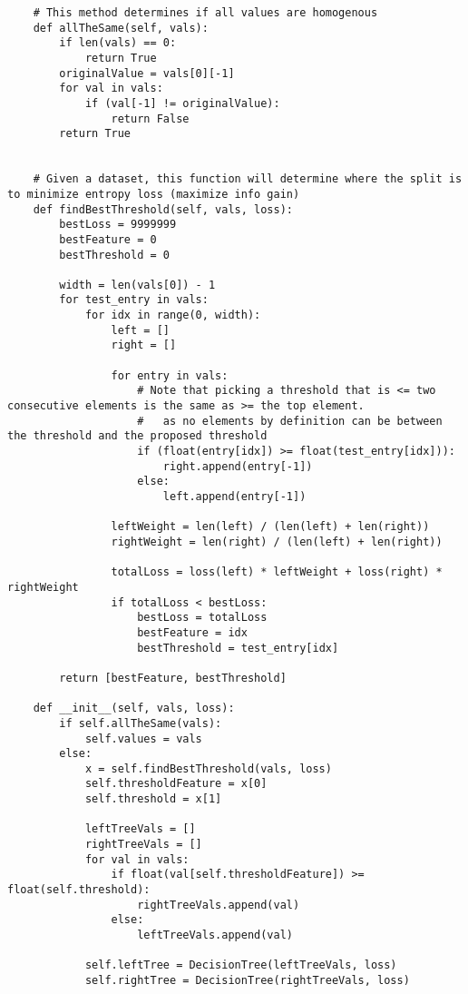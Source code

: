\documentclass{article}
\begin{document}
\begin{titlepage}
\begin{lstlisting}
    # This method determines if all values are homogenous
    def allTheSame(self, vals):
        if len(vals) == 0:
            return True
        originalValue = vals[0][-1]
        for val in vals:
            if (val[-1] != originalValue):
                return False
        return True


    # Given a dataset, this function will determine where the split is to minimize entropy loss (maximize info gain)
    def findBestThreshold(self, vals, loss):
        bestLoss = 9999999
        bestFeature = 0
        bestThreshold = 0

        width = len(vals[0]) - 1
        for test_entry in vals:
            for idx in range(0, width):
                left = []
                right = []

                for entry in vals:
                    # Note that picking a threshold that is <= two consecutive elements is the same as >= the top element.
                    #   as no elements by definition can be between the threshold and the proposed threshold
                    if (float(entry[idx]) >= float(test_entry[idx])):
                        right.append(entry[-1])
                    else:
                        left.append(entry[-1])

                leftWeight = len(left) / (len(left) + len(right))
                rightWeight = len(right) / (len(left) + len(right))

                totalLoss = loss(left) * leftWeight + loss(right) * rightWeight
                if totalLoss < bestLoss:
                    bestLoss = totalLoss
                    bestFeature = idx
                    bestThreshold = test_entry[idx]

        return [bestFeature, bestThreshold]

    def __init__(self, vals, loss):
        if self.allTheSame(vals):
            self.values = vals
        else:
            x = self.findBestThreshold(vals, loss)
            self.thresholdFeature = x[0]
            self.threshold = x[1]

            leftTreeVals = []
            rightTreeVals = []
            for val in vals:
                if float(val[self.thresholdFeature]) >= float(self.threshold):
                    rightTreeVals.append(val)
                else:
                    leftTreeVals.append(val)

            self.leftTree = DecisionTree(leftTreeVals, loss)
            self.rightTree = DecisionTree(rightTreeVals, loss)


\end{lstlisting}
\end{titlepage}
\end{document}
